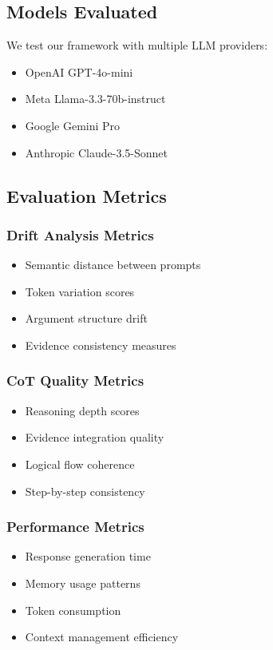 \documentclass[11pt]{article}
\begin{document}
\subsection{Models Evaluated}

We test our framework with multiple LLM providers:
\begin{itemize}
    \item OpenAI GPT-4o-mini
    \item Meta Llama-3.3-70b-instruct
    \item Google Gemini Pro
    \item Anthropic Claude-3.5-Sonnet
\end{itemize}

\subsection{Evaluation Metrics}

\subsubsection{Drift Analysis Metrics}
\begin{itemize}
    \item Semantic distance between prompts
    \item Token variation scores
    \item Argument structure drift
    \item Evidence consistency measures
\end{itemize}

\subsubsection{CoT Quality Metrics}
\begin{itemize}
    \item Reasoning depth scores
    \item Evidence integration quality
    \item Logical flow coherence
    \item Step-by-step consistency
\end{itemize}

\subsubsection{Performance Metrics}
\begin{itemize}
    \item Response generation time
    \item Memory usage patterns
    \item Token consumption
    \item Context management efficiency
\end{itemize}
\end{document}
